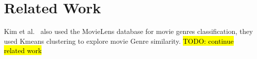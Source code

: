 \section{Related Work}

Kim et al.~\cite{5575081} also used the MovieLens database for movie genres classification, they used Kmeans clustering to explore movie Genre similarity. \hl{TODO: continue related work}